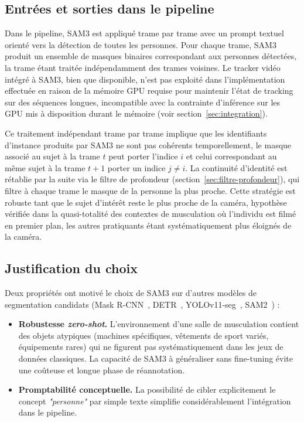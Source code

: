 \subsection{Entrées et sorties dans le pipeline}

Dans le pipeline, SAM3 est appliqué trame par trame avec un prompt textuel orienté vers la détection de toutes les personnes. Pour chaque trame, SAM3 produit un ensemble de masques binaires correspondant aux personnes détectées, la trame étant traitée indépendamment des trames voisines. Le tracker vidéo intégré à SAM3, bien que disponible, n'est pas exploité dans l'implémentation effectuée en raison de la mémoire GPU requise pour maintenir l'état de tracking sur des séquences longues, incompatible avec la contrainte d'inférence sur les GPU mis à disposition durant le mémoire (voir section~\ref{sec:integration}).

Ce traitement indépendant trame par trame implique que les identifiants d'instance produits par SAM3 ne sont pas cohérents temporellement, le masque associé au sujet à la trame $t$ peut porter l'indice $i$ et celui correspondant au même sujet à la trame $t+1$ porter un indice $j \neq i$. La continuité d'identité est rétablie par la suite via le filtre de profondeur (section~\ref{sec:filtre-profondeur}), qui filtre à chaque trame le masque de la personne la plus proche. Cette stratégie est robuste tant que le sujet d'intérêt reste le plus proche de la caméra, hypothèse vérifiée dans la quasi-totalité des contextes de musculation où l'individu est filmé en premier plan, les autres pratiquants étant systématiquement plus éloignés de la caméra.

\subsection{Justification du choix}

Deux propriétés ont motivé le choix de SAM3 sur d'autres modèles de segmentation candidats (Mask R-CNN~\cite{Mask-R-CNN-2018}, DETR~\cite{DETR-2020}, YOLOv11-seg~\cite{Ultralytics-YOLO-2026}, SAM2~\cite{SAM2-2024}) :

\begin{itemize}
  \item \textbf{Robustesse \textit{zero-shot}.} L'environnement d'une salle de musculation contient des objets atypiques (machines spécifiques, vêtements de sport variés, équipements rares) qui ne figurent pas systématiquement dans les jeux de données classiques. La capacité de SAM3 à généraliser sans fine-tuning évite une coûteuse et longue phase de réannotation.
  \item \textbf{Promptabilité conceptuelle.} La possibilité de cibler explicitement le concept \emph{"personne"} par simple texte simplifie considérablement l'intégration dans le pipeline.
\end{itemize}


